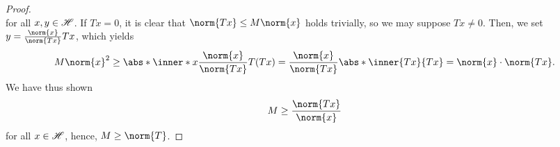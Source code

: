 \begin{proof}
\begin{equation*}
    \end{equation*}
    for all \(x, y \in \mathscr{H}\). If \(Tx = 0\), it is clear that \(\norm{Tx} \leq M \norm{x}\) holds trivially, so we may suppose \(Tx \neq 0\). Then, we set \(y = \frac{\norm{x}}{\norm{Tx}}Tx\), which yields
    \begin{equation*}
        M \norm{x}^2 \geq \abs*{\inner*{x}{\frac{\norm{x}}{\norm{Tx}}T(Tx)}} = \frac{\norm{x}}{\norm{Tx}} \abs*{\inner{Tx}{Tx}} = \norm{x}\cdot \norm{Tx}.
    \end{equation*}
    We have thus shown
    \begin{equation*}
        M \geq \frac{\norm{Tx}}{\norm{x}}
    \end{equation*}
    for all \(x \in \mathscr{H}\), hence, \(M \geq \norm{T}\).
\end{proof}

